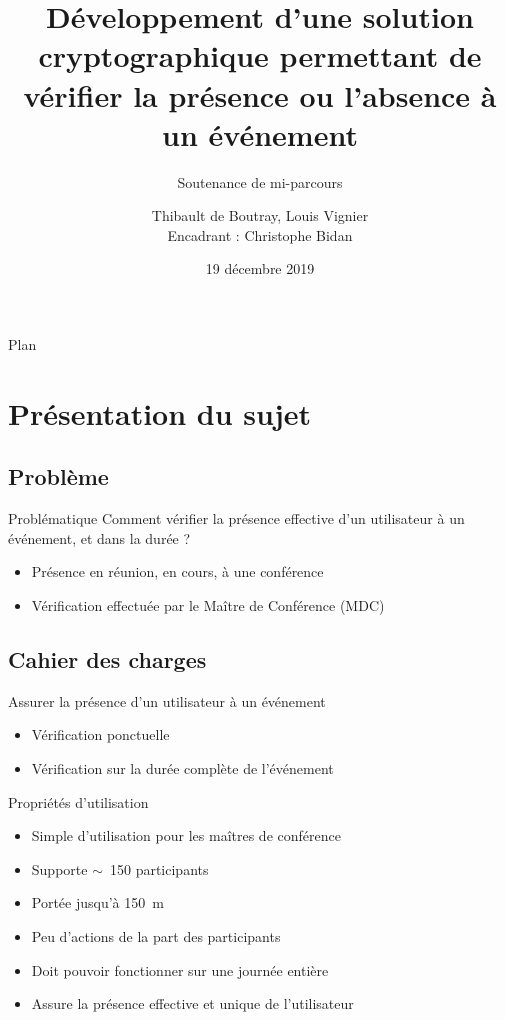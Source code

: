 \documentclass[aspectratio=169]{beamer}
\title{Développement d'une solution cryptographique permettant de vérifier la présence ou l'absence à un événement}
\subtitle{Soutenance de mi-parcours}
\author[me]{Thibault de Boutray, Louis Vignier\\[2mm]Encadrant : Christophe Bidan}
\institute{CentraleSupélec}
\date{19 décembre 2019}
\begin{document}
\begin{frame}
  \titlepage
\end{frame}

\begin{frame}{Plan}
  \tableofcontents
\end{frame}

\section{Présentation du sujet}

\subsection{Problème}

\begin{frame}{Problématique}
	Comment vérifier la présence effective d'un utilisateur à un événement, et dans la durée ?
	
	\bigskip
	
	\begin{itemize}
        \item Présence en réunion, en cours, à une conférence
        \item Vérification effectuée par le Maître de Conférence (MDC)
	\end{itemize}

\end{frame}

\subsection{Cahier des charges}

\begin{frame}{Assurer la présence d’un utilisateur à un événement}	
    \begin{itemize}
        \item Vérification ponctuelle\pause
        \item Vérification sur la durée complète de l'événement
    \end{itemize}
\end{frame}

\begin{frame}{Propriétés d'utilisation}
    \begin{itemize}
        \item Simple d’utilisation pour les maîtres de conférence\pause
        \item Supporte $\sim$~150 participants\pause
        \item Portée jusqu'à \SI{150}{\meter}\pause
        \item Peu d’actions de la part des participants\pause
        \item Doit pouvoir fonctionner sur une journée entière\pause
        \item Assure la présence effective et unique de l’utilisateur
    \end{itemize}
\end{frame}
\end{document}
